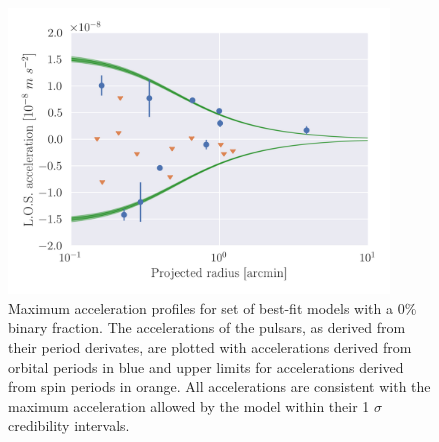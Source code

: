 \begin{figure}
	\centering
	\includegraphics[width=0.9\textwidth]{figures/pulsar_posteriors/max_az_contours.png}
	\caption{Maximum acceleration profiles for set of best-fit models with a $0\%$ binary
		fraction. The accelerations of the pulsars, as derived from their period derivates,
		are plotted with accelerations derived from orbital periods in blue and upper limits
		for accelerations derived from spin periods in orange. All accelerations are
		consistent with the maximum acceleration allowed by the model within their 1
		$\sigma$ credibility intervals.}
	\label{fig:pulsar_max_az}
\end{figure}

